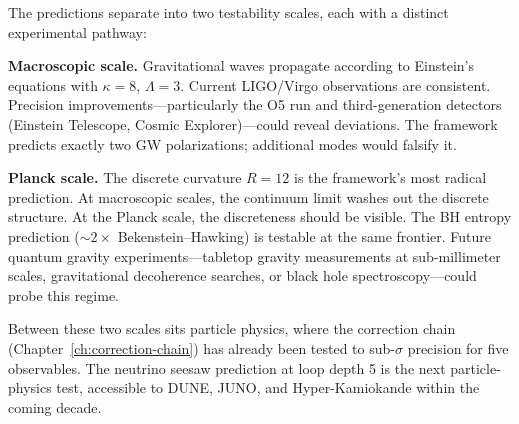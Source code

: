 \documentclass[11pt,a4paper]{book}
\begin{document}
The predictions separate into two testability scales, each with a distinct experimental pathway:

\textbf{Macroscopic scale.} Gravitational waves propagate according to Einstein's equations with $\kappa = 8$, $\Lambda = 3$. Current LIGO/Virgo observations are consistent. Precision improvements---particularly the O5 run and third-generation detectors (Einstein Telescope, Cosmic Explorer)---could reveal deviations. The framework predicts exactly two GW polarizations; additional modes would falsify it.

\textbf{Planck scale.} The discrete curvature $R = 12$ is the framework's most radical prediction. At macroscopic scales, the continuum limit washes out the discrete structure. At the Planck scale, the discreteness should be visible. The BH entropy prediction ($\sim 2 \times$ Bekenstein--Hawking) is testable at the same frontier. Future quantum gravity experiments---tabletop gravity measurements at sub-millimeter scales, gravitational decoherence searches, or black hole spectroscopy---could probe this regime.

Between these two scales sits particle physics, where the correction chain (Chapter~\ref{ch:correction-chain}) has already been tested to sub-$\sigma$ precision for five observables. The neutrino seesaw prediction at loop depth 5 is the next particle-physics test, accessible to DUNE, JUNO, and Hyper-Kamiokande within the coming decade.
\end{document}
